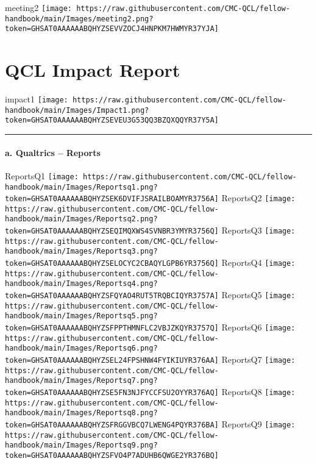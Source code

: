\documentclass[
]{book}
\begin{document}
meeting2
\texttt{[image: https://raw.githubusercontent.com/CMC-QCL/fellow-handbook/main/Images/meeting2.png?token=GHSAT0AAAAAABQHYZSEVVZOCJ4HNPKM7HWMYR37YJA]}

\hypertarget{qcl-impact-report}{%
\chapter{QCL Impact Report}\label{qcl-impact-report}}

impact1
\texttt{[image: https://raw.githubusercontent.com/CMC-QCL/fellow-handbook/main/Images/Impact1.png?token=GHSAT0AAAAAABQHYZSEVEU3G53QQ3BZQXQQYR37Y5A]}

\begin{center}\rule{0.5\linewidth}{0.5pt}\end{center}

\hypertarget{a.-qualtrics-reports}{%
\subsubsection{\texorpdfstring{a. Qualtrics -- Reports }{a. Qualtrics -- Reports }}\label{a.-qualtrics-reports}}

ReportsQ1
\texttt{[image: https://raw.githubusercontent.com/CMC-QCL/fellow-handbook/main/Images/Reportsq1.png?token=GHSAT0AAAAAABQHYZSEK6DVIFJSRAILBOAMYR3756A]}
ReportsQ2
\texttt{[image: https://raw.githubusercontent.com/CMC-QCL/fellow-handbook/main/Images/Reportsq2.png?token=GHSAT0AAAAAABQHYZSEQIMQXWS4SVNBR3YMYR3756Q]}
ReportsQ3
\texttt{[image: https://raw.githubusercontent.com/CMC-QCL/fellow-handbook/main/Images/Reportsq3.png?token=GHSAT0AAAAAABQHYZSELOCYC2CBAQYLGPB6YR3756Q]}
ReportsQ4
\texttt{[image: https://raw.githubusercontent.com/CMC-QCL/fellow-handbook/main/Images/Reportsq4.png?token=GHSAT0AAAAAABQHYZSFQYAO4RUT5TRQBCIQYR3757A]}
ReportsQ5
\texttt{[image: https://raw.githubusercontent.com/CMC-QCL/fellow-handbook/main/Images/Reportsq5.png?token=GHSAT0AAAAAABQHYZSFPPTHMNFLC2VBJZKQYR3757Q]}
ReportsQ6
\texttt{[image: https://raw.githubusercontent.com/CMC-QCL/fellow-handbook/main/Images/Reportsq6.png?token=GHSAT0AAAAAABQHYZSEL24FPSHNW4FYIKIUYR376AA]}
ReportsQ7
\texttt{[image: https://raw.githubusercontent.com/CMC-QCL/fellow-handbook/main/Images/Reportsq7.png?token=GHSAT0AAAAAABQHYZSE5FN3NJFYCCFSU2OYYR376AQ]}
ReportsQ8
\texttt{[image: https://raw.githubusercontent.com/CMC-QCL/fellow-handbook/main/Images/Reportsq8.png?token=GHSAT0AAAAAABQHYZSFRGGVBCQ7LWENG4PQYR376BA]}
ReportsQ9
\texttt{[image: https://raw.githubusercontent.com/CMC-QCL/fellow-handbook/main/Images/Reportsq9.png?token=GHSAT0AAAAAABQHYZSFVO4P7ADUHB6QWGE2YR376BQ]}
\end{document}
